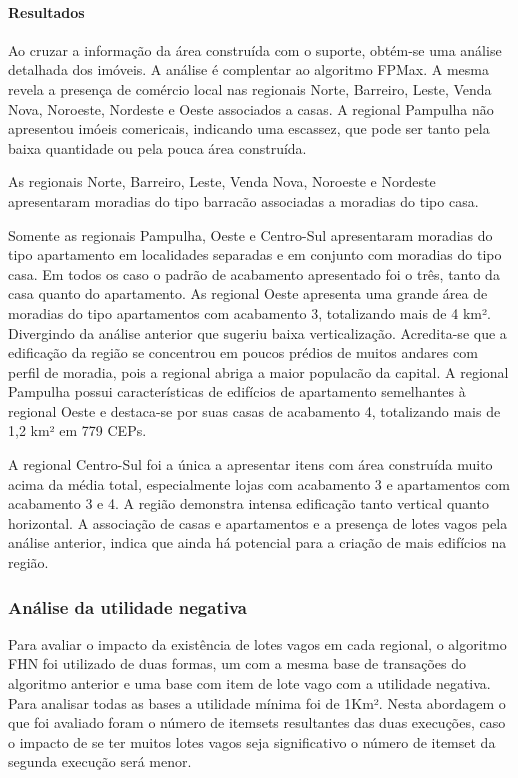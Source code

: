 \documentclass[12pt]{article}
\begin{document}
\paragraph{Resultados}
Ao cruzar a informação da área construída com o suporte, obtém-se uma análise detalhada dos imóveis. A análise é complentar ao algoritmo FPMax. A mesma revela a presença de comércio local nas regionais Norte, Barreiro, Leste, Venda Nova, Noroeste, Nordeste e Oeste associados a casas. A regional Pampulha não apresentou imóeis comericais, indicando uma escassez, que pode ser tanto pela baixa quantidade ou pela pouca área construída.

As regionais Norte, Barreiro, Leste, Venda Nova, Noroeste e Nordeste apresentaram moradias do tipo barracão associadas a moradias do tipo casa.

Somente as regionais Pampulha, Oeste e Centro-Sul apresentaram moradias do tipo apartamento em localidades separadas e em conjunto com moradias do tipo casa. Em todos os caso o padrão de acabamento apresentado foi o três, tanto da casa quanto do apartamento. As regional Oeste apresenta uma grande área de moradias do tipo apartamentos com acabamento 3, totalizando mais de 4 km². Divergindo da análise anterior que sugeriu baixa verticalização. Acredita-se que a edificação da região se concentrou em poucos prédios de muitos andares com perfil de moradia, pois a regional abriga a maior populacão da capital. A regional Pampulha possui características de edifícios de apartamento semelhantes à regional Oeste e destaca-se por suas casas de acabamento 4, totalizando mais de 1,2 km² em 779 CEPs.

A regional Centro-Sul foi a única a apresentar itens com área construída muito acima da média total, especialmente lojas com acabamento 3 e apartamentos com acabamento 3 e 4. A região demonstra intensa edificação tanto vertical quanto horizontal. A associação de casas e apartamentos e a presença de lotes vagos pela análise anterior, indica que ainda há potencial para a criação de mais edifícios na região.

 \subsubsection{Análise da utilidade negativa}
Para avaliar o impacto da existência de lotes vagos em cada regional, o algoritmo FHN \cite{fournier2014fhn} foi utilizado de duas formas, um com a mesma base de transações do algoritmo anterior e uma base com item de lote vago com a utilidade negativa. Para analisar todas as bases a utilidade mínima foi de 1Km².
Nesta abordagem o que foi avaliado foram o número de itemsets resultantes das duas execuções, caso o impacto de se ter muitos lotes vagos seja significativo o número de itemset da segunda execução será menor.
\end{document}
